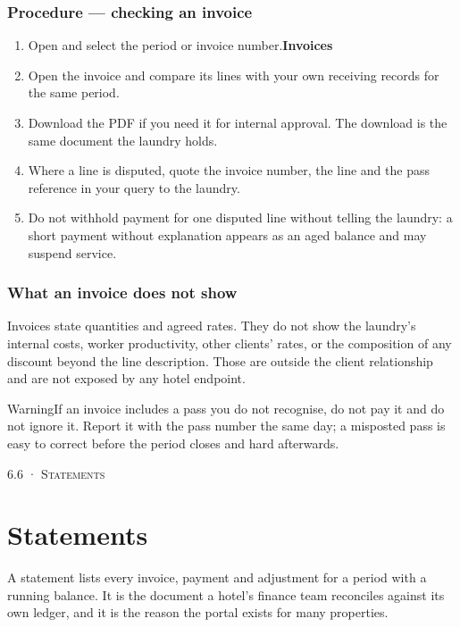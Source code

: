 \documentclass[11pt,a4paper,oneside]{book}
\begin{document}
\subsubsection*{Procedure — checking an invoice}
\begin{enumerate}
\item Open  and select the period or invoice number.\textbf{Invoices}
\item Open the invoice and compare its lines with your own receiving records for the same period.
\item Download the PDF if you need it for internal approval. The download is the same document the laundry holds.
\item Where a line is disputed, quote the invoice number, the line and the pass reference in your query to the laundry.
\item Do not withhold payment for one disputed line without telling the laundry: a short payment without explanation appears as an aged balance and may suspend service.
\end{enumerate}
\subsubsection*{What an invoice does not show}
Invoices state quantities and agreed rates. They do not show the laundry's internal costs, worker productivity, other clients' rates, or the composition of any discount beyond the line description. Those are outside the client relationship and are not exposed by any hotel endpoint.

\begin{notebox}WarningIf an invoice includes a pass you do not recognise, do not pay it and do not ignore it. Report it with the pass number the same day; a misposted pass is easy to correct before the period closes and hard afterwards.\end{notebox}
\textsc{\small\color{crimson}6.6 · Statements}\par\medskip
\section*{Statements}
A statement lists every invoice, payment and adjustment for a period with a running balance. It is the document a hotel's finance team reconciles against its own ledger, and it is the reason the portal exists for many properties.
\end{document}
